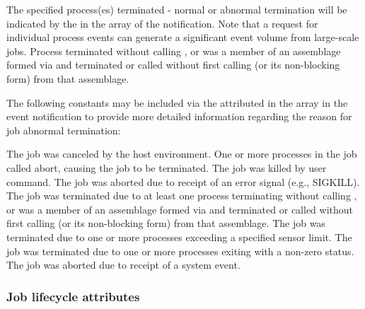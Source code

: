 \begin{constantdesc}
%
The specified process(es) terminated - normal or abnormal
termination will be indicated by the  in the
 array of the notification. Note that a request for individual
process events can generate a significant event volume from large-scale jobs.
%
Process terminated without calling , or was a member of an assemblage formed via  and terminated or called  without first calling  (or its non-blocking form) from that assemblage.
%
\end{constantdesc}

The following constants may be included via the
 attributed in the  array in the
 event notification to provide more detailed
information regarding the reason for job abnormal termination:

\begin{constantdesc}
%
The job was canceled by the host environment.
%
One or more processes in the job called abort, causing the job to be terminated.
%
The job was killed by user command.
%
The job was aborted due to receipt of an error signal (e.g., SIGKILL).
%
The job was terminated due to at least one process terminating without calling , or was a member of an assemblage formed via  and terminated or called  without first calling  (or its non-blocking form) from that assemblage.
%
The job was terminated due to one or more processes exceeding a specified sensor limit.
%
The job was terminated due to one or more processes exiting with a non-zero status.
%
The job was aborted due to receipt of a system event.
%
\end{constantdesc}


\subsubsection{Job lifecycle attributes}

